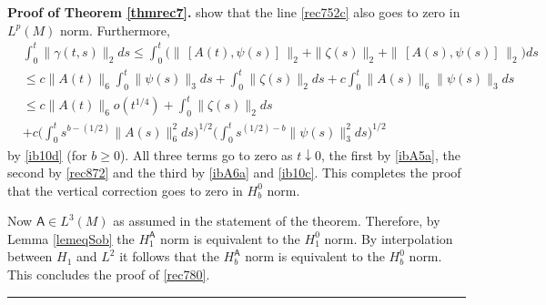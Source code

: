 \documentclass[12pt]{article}
\newenvironment{proof}[1][Proof]{\textbf{#1.} }{\ \rule{0.5em}{0.5em}}
\def \({\Big(}
\def \){\Big)}
\def \As{\mathsf{A}}
\def \eref{\eqref}
\numberwithin{equation}{section}
\begin{document}
\begin{proof}[Proof of Theorem \ref{thmrec7}]
show that the line \eref{rec752c} also goes to zero in $L^p(M)$ norm.
 Furthermore,       
\begin{align*}
&\int_0^t\|\gamma(t,s)\|_2 ds \le \int_0^t\(\|\, [A(t),\psi(s)]\,\|_2  +\|\zeta(s)\|_2 + \|\, [A(s),\psi(s)]\,\|_2\) ds  \\
&\le c\|A(t)\|_6 \int_0^t \| \psi(s)\|_3 ds  +\int_0^t \|\zeta(s)\|_2 ds +c\int_0^t\| A(s)\|_6 \|\psi(s)\|_3 ds \\
&\le c\|A(t)\|_6 o(t^{1/4})   +\int_0^t \|\zeta(s)\|_2 ds   \\
&+c\(\int_0^t s^{b-(1/2)} \|A(s)\|_6^2 ds\)^{1/2} \(\int_0^t s^{(1/2) - b} \|\psi(s)\|_3^2 ds\)^{1/2}
\end{align*} 
by \eref{ib10d} (for $b \ge 0$).
 All three terms go to zero as $t\downarrow 0$,
the first by \eref{ibA5a}, the second by \eref{rec872} and the third by \eref{ibA6a} and \eref{ib10c}.
 This completes the proof that the vertical correction 
 goes to zero in $H_b^0$ norm.
 
      Now $\As \in L^3(M)$ as assumed in the statement of the theorem. Therefore, by Lemma \ref{lemeqSob}
      the $H_1^\As$ norm is equivalent to the $H_1^0$ norm. By interpolation between $H_1$ and $L^2$
      it follows that the $H_b^\As$ norm is equivalent to the $H_b^0$ norm. 
      This concludes the proof of  \eref{rec780}. 
\end{proof}
\end{document}
